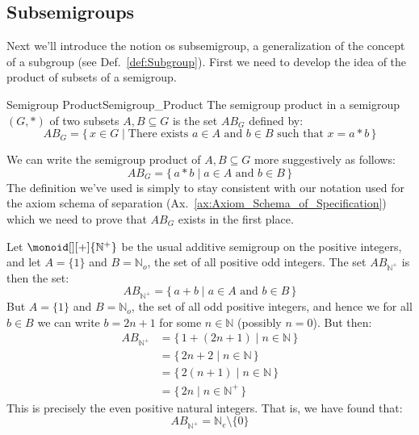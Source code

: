     \subsection{Subsemigroups}
        Next we'll introduce the notion os subsemigroup, a generalization of the
        concept of a subgroup (see Def.~\ref{def:Subgroup}). First we need to
        develop the idea of the product of subsets of a semigroup.
        \begin{fdefinition}{Semigroup Product}{Semigroup_Product}
            The semigroup product in a semigroup $(G,*)$ of two subsets
            $A,B\subseteq{G}$ is the set $AB_{G}$ defined by:
            \begin{equation*}
                AB_{G}=\{\,x\in{G}\;|\;\textrm{There exists }a\in{A}
                    \textrm{ and }b\in{B}\textrm{ such that }x=a*b\,\}
            \end{equation*}
        \end{fdefinition}
        We can write the semigroup product of $A,B\subseteq{G}$ more
        suggestively as follows:
        \begin{equation}
            AB_{G}=\{\,a*b\;|\;a\in{A}\textrm{ and }b\in{B}\,\}
        \end{equation}
        The definition we've used is simply to stay consistent with our notation
        used for the axiom schema of separation
        (Ax.~\ref{ax:Axiom_Schema_of_Specification}) which we need to prove that
        $AB_{G}$ exists in the first place.
        \begin{example}
            Let $\monoid[][+]{\mathbb{N}^{+}}$ be the usual additive semigroup
            on the positive integers, and let $A=\{1\}$ and
            $B=\mathbb{N}_{o}$, the set of all positive odd integers. The set
            $AB_{\mathbb{N}^{+}}$ is then the set:
            \begin{equation}
                AB_{\mathbb{N}^{+}}=\{\,a+b\;|\;a\in{A}\textrm{ and }b\in{B}\,\}
            \end{equation}
            But $A=\{1\}$ and $B=\mathbb{N}_{o}$, the set of all odd positive
            integers, and hence we for all $b\in{B}$ we can write $b=2n+1$ for
            some $n\in\mathbb{N}$ (possibly $n=0$). But then:
            \begin{subequations}
                \begin{align}
                    AB_{\mathbb{N}^{+}}&=\{\,1+(2n+1)\;|\;n\in\mathbb{N}\,\}\\
                        &=\{\,2n+2\;|\;n\in\mathbb{N}\,\}\\
                        &=\{\,2(n+1)\;|\;n\in\mathbb{N}\,\}\\
                        &=\{\,2n\;|\;n\in\mathbb{N}^{+}\,\}
                \end{align}
            \end{subequations}
            This is precisely the even positive natural integers. That is, we
            have found that:
            \begin{equation}
                AB_{\mathbb{N}^{+}}=\mathbb{N}_{e}\setminus\{0\}
            \end{equation}
        \end{example}
